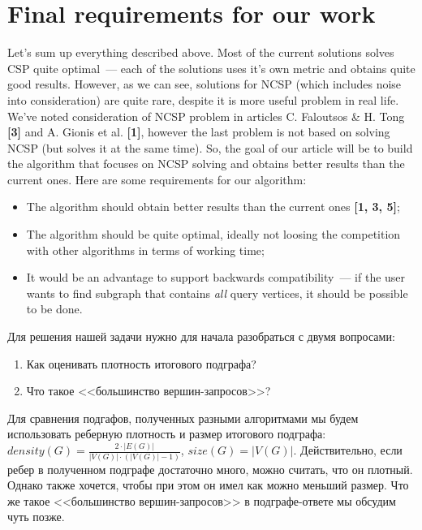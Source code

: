 \documentclass[11pt,a4paper,oneside]{article}
\begin{document}
\section{Final requirements for our work}

Let's sum up everything described above. Most of the current solutions solves CSP quite optimal~--- each of the solutions uses it's own metric and obtains quite good results. However, as we can see, solutions for NCSP (which includes noise into consideration) are quite rare, despite it is more useful problem in real life. We've noted consideration of NCSP problem in articles C. Faloutsos \& H. Tong \textbf{[3]} and A. Gionis et al. \textbf{[1]}, however the last problem is not based on solving NCSP (but solves it at the same time). So, the goal of our article will be to build the algorithm that focuses on NCSP solving and obtains better results than the current ones. Here are some requirements for our algorithm:

\begin{itemize}
    \item The algorithm should obtain better results than the current ones \textbf{[1, 3, 5]};
    \item The algorithm should be quite optimal, ideally not loosing the competition with other algorithms in terms of working time;
    \item It would be an advantage to support backwards compatibility~--- if the user wants to find subgraph that contains \textit{all} query vertices, it should be possible to be done.
\end{itemize}



Для решения нашей задачи нужно для начала разобраться с двумя вопросами:

\begin{enumerate}
  \item Как оценивать плотность итогового подграфа?
  \item Что такое <<большинство вершин-запросов>>?
\end{enumerate}

Для сравнения подгафов, полученных разными алгоритмами мы будем использовать реберную плотность и размер итогового подграфа: $density(G) = \frac{2 \cdot |E(G)|}{|V(G)| \cdot (|V(G)| - 1)}$, $size(G) = |V(G)|$. Действительно, если ребер в полученном подграфе достаточно много, можно считать, что он плотный. Однако также хочется, чтобы при этом он имел как можно меньший размер. Что же такое <<большинство вершин-запросов>> в подграфе-ответе мы обсудим чуть позже.
\end{document}
